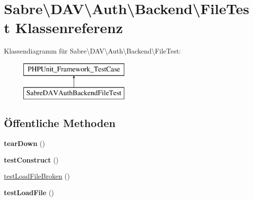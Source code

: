 \hypertarget{class_sabre_1_1_d_a_v_1_1_auth_1_1_backend_1_1_file_test}{}\section{Sabre\textbackslash{}D\+AV\textbackslash{}Auth\textbackslash{}Backend\textbackslash{}File\+Test Klassenreferenz}
\label{class_sabre_1_1_d_a_v_1_1_auth_1_1_backend_1_1_file_test}
Klassendiagramm für Sabre\textbackslash{}D\+AV\textbackslash{}Auth\textbackslash{}Backend\textbackslash{}File\+Test\+:\begin{figure}[H]
\begin{center}
\leavevmode
\includegraphics[height=2.000000cm]{class_sabre_1_1_d_a_v_1_1_auth_1_1_backend_1_1_file_test}
\end{center}
\end{figure}
\subsection*{Öffentliche Methoden}
\begin{DoxyCompactItemize}
\item 
\mbox{\label{class_sabre_1_1_d_a_v_1_1_auth_1_1_backend_1_1_file_test_a875e2db6948e51f3801e97a3b388e53a}} 
{\bfseries tear\+Down} ()
\item 
\mbox{\label{class_sabre_1_1_d_a_v_1_1_auth_1_1_backend_1_1_file_test_a9a96fd1c44fe518ac3dea67026123253}} 
{\bfseries test\+Construct} ()
\item 
\mbox{\hyperlink{class_sabre_1_1_d_a_v_1_1_auth_1_1_backend_1_1_file_test_a9084db2414e88613ad9c428cc1b0b6ff}{test\+Load\+File\+Broken}} ()
\item 
\mbox{\label{class_sabre_1_1_d_a_v_1_1_auth_1_1_backend_1_1_file_test_a7e89557b5e6761c682b63e32aa663d9a}} 
{\bfseries test\+Load\+File} ()
\end{DoxyCompactItemize}


